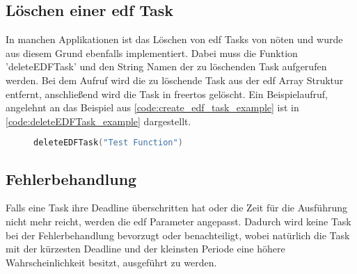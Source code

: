 \documentclass[../EDF Master Thesis.tex]{subfiles}
\begin{document}
\subsection{Löschen einer \ac{edf} Task} \label{section:löschen_einer_edf_task}

    In manchen Applikationen ist das Löschen von \ac{edf} Tasks von nöten und wurde aus diesem Grund ebenfalls implementiert.
    Dabei muss die Funktion 'deleteEDFTask' und den String Namen der zu löschenden Task aufgerufen werden.
    Bei dem Aufruf wird die zu löschende Task aus der \ac{edf} Array Struktur entfernt, anschließend wird die Task in \ac{freertos} gelöscht.
    Ein Beispielaufruf, angelehnt an das Beispiel aus \autoref{code:create_edf_task_example} ist in \autoref{code:deleteEDFTask_example} dargestellt.

\begin{figure}[ht!]
\begin{lstlisting}[language=C, caption=deleteEDFTask Beispiel, label=code:deleteEDFTask_example]
    deleteEDFTask("Test Function")
\end{lstlisting}
\end{figure}

\subsection{Fehlerbehandlung} \label{section:Fehlerbehandlung}

    Falls eine Task ihre Deadline überschritten hat oder die Zeit für die Ausführung nicht mehr reicht, werden die \ac{edf} Parameter angepasst.
    Dadurch wird keine Task bei der Fehlerbehandlung bevorzugt oder benachteiligt, wobei natürlich die Task mit der kürzesten Deadline und der kleinsten Periode eine höhere Wahrscheinlichkeit besitzt, ausgeführt zu werden. 
\end{document}
